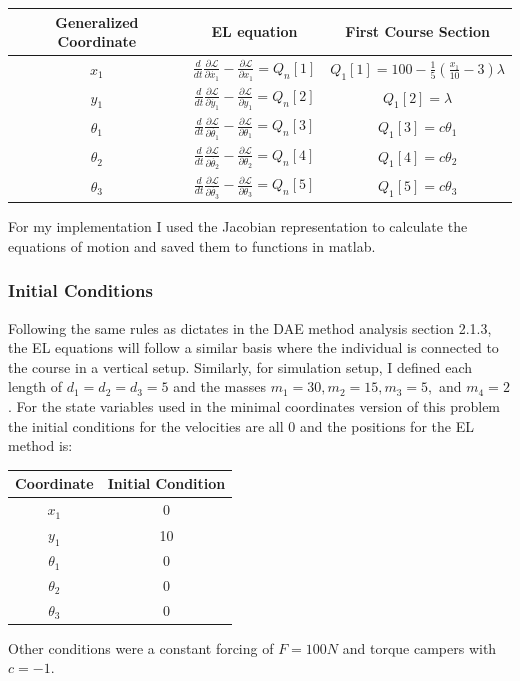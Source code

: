 \documentclass{article}
\begin{document}
\begin{center}
	\begin{tabular}{c|c|c}
		Generalized Coordinate & EL equation &First Course Section\\
		\hline
		$x_1$ & $\frac{d}{dt}\frac{\partial{\mathcal{L}}}{\partial{\dot{x_1}}}-\frac{\partial{\mathcal{L}}}{\partial{x_1}}=Q_n[1]$&$Q_1[1] = 100 - \frac{1}{5} \left( \frac{x_1}{10} - 3 \right) \lambda$\\
		$y_1$ & $\frac{d}{dt}\frac{\partial{\mathcal{L}}}{\partial{\dot{y_1}}}-\frac{\partial{\mathcal{L}}}{\partial{y_1}}=Q_n[2]$&$Q_1[2] = \lambda$\\
		$\theta_1$ & $\frac{d}{dt}\frac{\partial{\mathcal{L}}}{\partial{\dot{\theta_1}}}-\frac{\partial{\mathcal{L}}}{\partial{\theta_1}}=Q_n[3]$ & $Q_1[3] = c\theta_1$	\\		
		$\theta_2$ & $\frac{d}{dt}\frac{\partial{\mathcal{L}}}{\partial{\dot{\theta_2}}}-\frac{\partial{\mathcal{L}}}{\partial{\theta_2}}=Q_n[4]$& $Q_1[4] = c\theta_2$	\\
		$\theta_3$ & $\frac{d}{dt}\frac{\partial{\mathcal{L}}}{\partial{\dot{\theta_3}}}-\frac{\partial{\mathcal{L}}}{\partial{\theta_3}}=Q_n[5]$& $Q_1[5] = c\theta_3$	\\
	\end{tabular}
\end{center}
For my implementation I used the Jacobian representation to calculate the equations of motion and saved them to functions in matlab. 
\subsubsection{Initial Conditions}
Following the same rules as dictates in the DAE method analysis section 2.1.3, the EL equations will follow a similar basis where the individual is connected to the course in a vertical setup. Similarly, for simulation setup, I defined each length of $d_1=d_2=d_3=5$ and the masses $m_1=30, m_2=15,m_3=5,$ and $m_4=2$. For the state variables used in the minimal coordinates version of this problem the initial conditions for the velocities are all 0 and the positions for the EL method is:
\begin{center}
	\begin{tabular}{c|c}
		Coordinate&Initial Condition\\
		\hline
		$x_1$&0\\
		$y_1$&10\\
		$\theta_1$&0\\
		$\theta_2$&0\\
		$\theta_3$&0
	\end{tabular}
\end{center}
Other conditions were a constant forcing of $F = 100N$ and torque campers with $c = -1$.
\newpage
\end{document}

